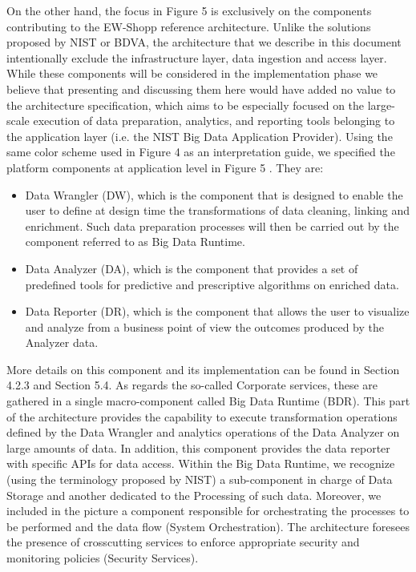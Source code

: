 On the other hand, the focus in Figure 5 is exclusively on the components contributing to the EW-Shopp reference architecture. Unlike the solutions proposed by NIST or BDVA, the architecture that we describe in this document intentionally exclude the infrastructure layer, data ingestion and access layer. While these components will be considered in the implementation phase we believe that presenting and discussing them here would have added no value to the architecture specification, which aims to be especially focused on the large-scale execution of data preparation, analytics, and reporting tools belonging to the application layer (i.e. the NIST Big Data Application Provider).
Using the same color scheme used in Figure 4 as an interpretation guide, we specified the platform components at application level in Figure 5 . They are:
\begin{itemize}
    \item Data Wrangler (DW), which is the component that is designed to enable the user to define at design time the transformations of data cleaning, linking and enrichment. Such data preparation processes will then be carried out by the component referred to as Big Data Runtime.
    \item Data Analyzer (DA), which is the component that provides a set of predefined tools for predictive and prescriptive algorithms on enriched data. 
    \item Data Reporter (DR), which is the component that allows the user to visualize and analyze from a business point of view the outcomes produced by the Analyzer data.  
\end{itemize}
More details on this component and its implementation can be found in Section 4.2.3 and Section 5.4. As regards the so-called Corporate services, these are gathered in a single macro-component called Big Data Runtime (BDR). This part of the architecture provides the capability to execute transformation operations defined by the Data Wrangler and analytics operations of the Data Analyzer on large amounts of data. In addition, this component provides the data reporter with specific APIs for data access. Within the Big Data Runtime, we recognize (using the terminology proposed by NIST) a sub-component in charge of Data Storage and another dedicated to the Processing of such data. Moreover, we included in the picture a component responsible for orchestrating the processes to be performed and the data flow (System Orchestration). 
The architecture foresees the presence of crosscutting services to enforce appropriate security and monitoring policies (Security Services).
